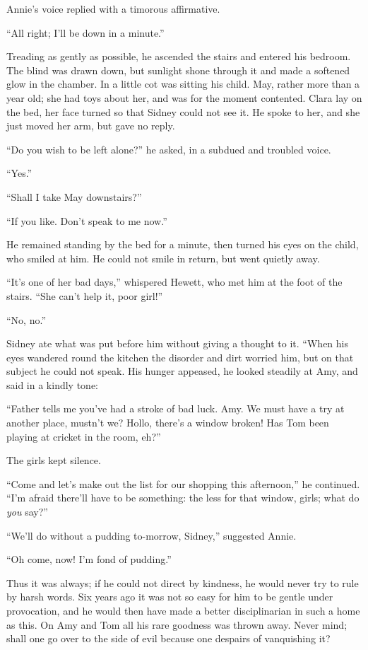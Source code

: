 Annie's voice replied with a timorous affirmative.

``All right; I'll be down in a minute.''

Treading as gently as possible, he ascended the stairs and entered his
bedroom. The blind was drawn down, but sunlight shone through it and
made a softened glow in the chamber. In a little cot was sitting his
child. May, rather more than a year old; she had toys about her, and was
for the moment contented. Clara lay on the bed, her face turned so that
Sidney could not see it. He spoke to her, and she just moved her arm,
but gave no reply.

``Do you wish to be left alone?'' he asked, in a subdued and troubled
voice.

{}``Yes.''

``Shall I take May downstairs?''

``If you like. Don't speak to me now.''

He remained standing by the bed for a minute, then turned his eyes on
the child, who smiled at him. He could not smile in return, but went
quietly away.

``It's one of her bad days,'' whispered Hewett, who met him at the foot
of the stairs. ``She can't help it, poor girl!''

``No, no.''

Sidney ate what was put before him without giving a thought to it.
``When his eyes wandered round the kitchen the disorder and dirt worried
him, but on that subject he could not speak. His hunger appeased, he
looked steadily at Amy, and said in a kindly tone:

``Father tells me you've had a stroke of bad luck. Amy. We must have a
try at another place, mustn't we? Hollo, there's a window broken! Has
Tom been playing at cricket in the room, eh?''

The girls kept silence.

``Come and let's make out the list for our shopping this afternoon,'' he
continued. ``I'm {}afraid there'll have to be something: the less for
that window, girls; what do \emph{you} say?''

``We'll do without a pudding to-morrow, Sidney,'' suggested Annie.

``Oh come, now! I'm fond of pudding.''

Thus it was always; if he could not direct by kindness, he would never
try to rule by harsh words. Six years ago it was not so easy for him to
be gentle under provocation, and he would then have made a better
disciplinarian in such a home as this. On Amy and Tom all his rare
goodness was thrown away. Never mind; shall one go over to the side of
evil because one despairs of vanquishing it?

